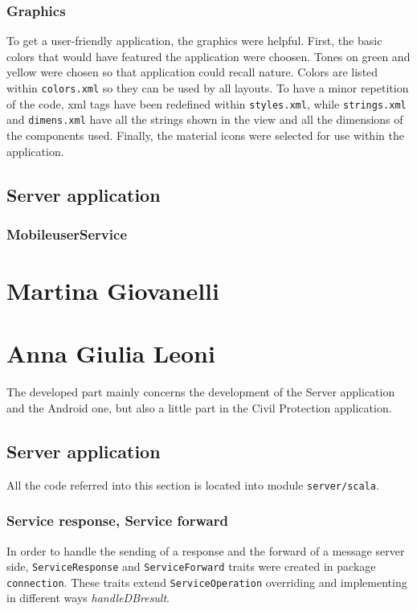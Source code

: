 \documentclass[a4paper,12pt]{report}
\begin{document}
\subsubsection{Graphics}
To get a user-friendly application, the graphics were helpful. First, the basic colors that would have featured the application were choosen. Tones on green and yellow were chosen so that application could recall nature. Colors are listed within \texttt{colors.xml} so they can be used by all layouts. To have a minor repetition of the code, xml tags have been redefined within \texttt{styles.xml}, while \texttt{strings.xml} and \texttt{dimens.xml} have all the strings shown in the view and all the dimensions of the components used. Finally, the material icons were selected for use within the application.

\subsection{Server application}
\subsubsection{MobileuserService}

\section{Martina Giovanelli}
\section{Anna Giulia Leoni}

The developed part mainly concerns the development of the Server application and the Android one, but also  a little part in the Civil Protection application.

\subsection{Server application}

All the code referred into this section is located into module \texttt{server/scala}.

\subsubsection{Service response, Service forward}
In order to handle the sending of a response and the forward of a message server side, \texttt{ServiceResponse} and \texttt{ServiceForward} traits were created in package \texttt{connection}. These traits extend \texttt{ServiceOperation} overriding and implementing in different ways \textit{handleDBresult}. 
\end{document}
